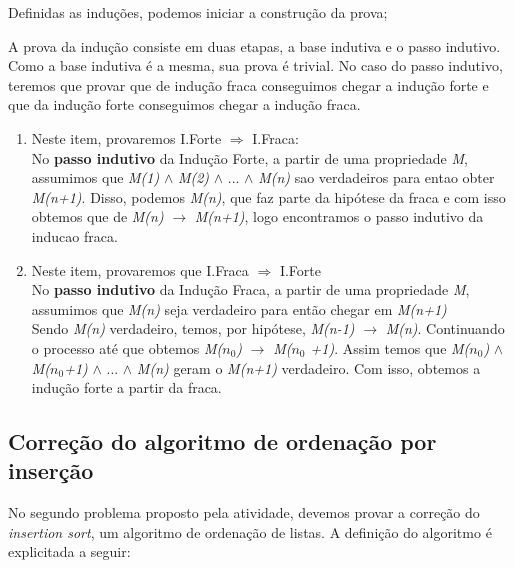 \documentclass[a4paper, 10pt]{article}
\begin{document}
Definidas as induções, podemos iniciar a construção da prova; 

A prova da indução consiste em duas etapas, a base indutiva e o passo indutivo.
Como a base indutiva é a mesma, sua prova é trivial.
No caso do passo indutivo, teremos que provar que de indução fraca conseguimos chegar a indução forte e que da indução forte conseguimos chegar a indução fraca.

\begin{enumerate}
\item Neste item, provaremos I.Forte $\Rightarrow$ I.Fraca:
	\\No \textbf{passo indutivo} da Indução Forte, a partir de uma propriedade \textit{M}, assumimos que \textit{M(1)} $\wedge$ \textit{M(2)} $\wedge$ ... $\wedge$ \textit{M(n)} sao verdadeiros para entao obter \textit{M(n+1)}. 
    Disso, podemos  \textit{M(n)}, que faz parte da hipótese da fraca e com isso obtemos que de \textit{M(n)} $\rightarrow$ \textit{M(n+1)}, logo encontramos o passo indutivo da inducao fraca.

\item Neste item, provaremos que I.Fraca $\Rightarrow$ I.Forte 
	\\	No \textbf{passo indutivo} da Indução Fraca, a partir de uma propriedade \textit{M}, assumimos que \textit{M(n)} seja verdadeiro para então chegar em \textit{M(n+1)}
    \\	Sendo \textit{M(n)} verdadeiro, temos, por hipótese, \textit{M(n-1)} $\rightarrow$ \textit{M(n)}. Continuando o processo até que obtemos \textit{M($n_0$)} $\rightarrow$ \textit{M($n_0$ +1)}. Assim temos que \textit{M($n_0$)} $\wedge$ \textit{M($n_0$+1)} $\wedge$ ... $\wedge$ \textit{M(n)} geram o \textit{M(n+1)} verdadeiro.
    Com isso, obtemos a indução forte a partir da fraca.
\end{enumerate}


\subsection{Correção do algoritmo de ordenação por inserção}
\label{sec:insertion}

No segundo problema proposto pela atividade, devemos provar a correção do \textit{insertion sort}, um algoritmo de ordenação de listas. A definição do algoritmo é explicitada a seguir:
\end{document}
